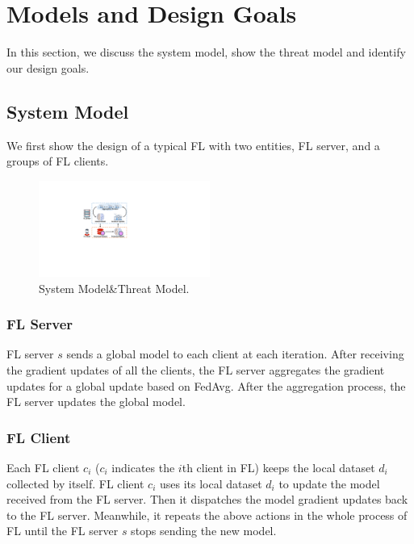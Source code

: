 \documentclass[journal]{IEEEtran}
\begin{document}
\section{Models and Design Goals}

In this section, we discuss the system model, show the threat model and identify our design goals.

\subsection{System Model}We first show the design of a typical FL with two entities, FL server, and a groups of FL clients.
  \begin{figure}
    \centering
  \includegraphics[width=0.5\textwidth]{figures/FLPhish_System.pdf}
  \caption{System Model\&Threat Model.}
  \label{fig_system}
  \end{figure}   
\subsubsection{{FL Server}} FL server $s$ sends a global model to each client at each iteration. After receiving the gradient updates of all the clients, the FL server aggregates the gradient updates for a global update based on FedAvg. After the aggregation process, the FL server updates the global model.

\subsubsection{{FL Client}} Each FL client {$c_{i}$} ($c_{i}$ indicates the $i$th client in FL) keeps the local dataset $d_{i}$ collected by itself. FL client $c_{i}$ uses its local dataset $d_{i}$ to update the model received from the FL server. Then it dispatches the model gradient updates back to the FL server. Meanwhile, it repeats the above actions in the whole process of FL until the FL server $s$ stops sending the new model.
\end{document}
